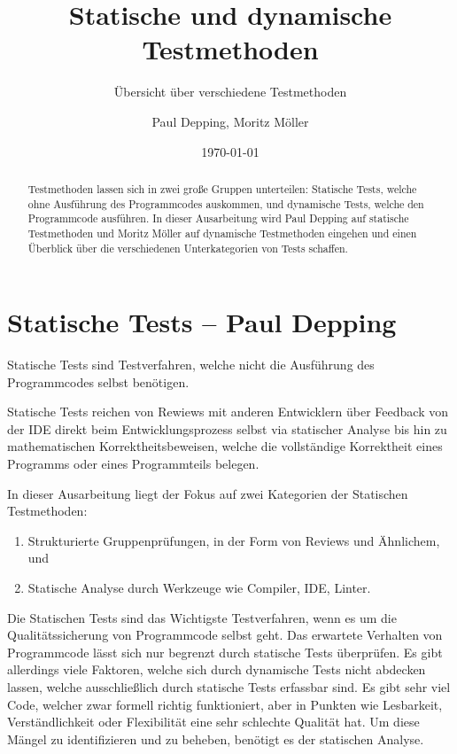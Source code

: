 \documentclass[	%
		fontsize=11pt,  %
		a4paper,	    %
		ngerman,		%
		sans,			%
		f4,				%
	]{HsH-report}		%
\author{
	Paul Depping,
	Moritz Möller
}
\title{Statische und dynamische Testmethoden}
\subtitle{Übersicht über verschiedene Testmethoden}
\date{\today}
\begin{document}

\frontmatter

\maketitle[c]

\declarationAuthorship

\begin{abstract}

	Testmethoden lassen sich in zwei große Gruppen unterteilen: Statische Tests,
	welche ohne Ausführung des Programmcodes auskommen, und dynamische Tests,
	welche den Programmcode ausführen. In dieser Ausarbeitung wird Paul Depping auf
	statische Testmethoden und Moritz Möller auf dynamische Testmethoden eingehen
	und einen Überblick über die verschiedenen Unterkategorien von Tests schaffen.

\end{abstract}

\tableofcontents

\mainmatter

\chapter{Statische Tests -- Paul Depping} \label{chap: static}
Statische Tests sind Testverfahren, welche nicht die Ausführung des
Programmcodes selbst benötigen.

Statische Tests reichen von Rewiews mit anderen Entwicklern über Feedback von
der IDE direkt beim Entwicklungsprozess selbst via statischer Analyse bis hin
zu mathematischen Korrektheitsbeweisen, welche die vollständige Korrektheit
eines Programms oder eines Programmteils belegen.

In dieser Ausarbeitung liegt der Fokus auf zwei Kategorien der Statischen
Testmethoden:
\begin{enumerate}
	\item Strukturierte Gruppenprüfungen, in der Form von Reviews und Ähnlichem, und
	\item Statische Analyse durch Werkzeuge wie Compiler, IDE, Linter.
\end{enumerate}

Die Statischen Tests sind das Wichtigste Testverfahren, wenn es um die
Qualitätssicherung von Programmcode selbst geht. Das erwartete Verhalten von
Programmcode lässt sich nur begrenzt durch statische Tests überprüfen. Es gibt
allerdings viele Faktoren, welche sich durch dynamische Tests nicht abdecken
lassen, welche ausschließlich durch statische Tests erfassbar sind. Es gibt
sehr viel Code, welcher zwar formell richtig funktioniert, aber in Punkten wie
Lesbarkeit, Verständlichkeit oder Flexibilität eine sehr schlechte Qualität
hat. Um diese Mängel zu identifizieren und zu beheben, benötigt es der
statischen Analyse.
\end{document}
